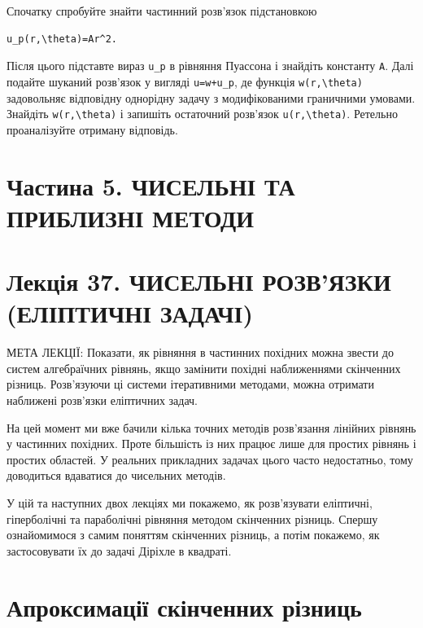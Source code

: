 \documentclass[
  ukrainian,
]{article}
\begin{document}
Спочатку спробуйте знайти частинний розв'язок підстановкою

\begin{verbatim}
u_p(r,\theta)=Ar^2.
\end{verbatim}

Після цього підставте вираз \texttt{u\_p} в рівняння Пуассона і знайдіть
константу \texttt{A}. Далі подайте шуканий розв'язок у вигляді
\texttt{u=w+u\_p}, де функція \texttt{w(r,\textbackslash{}theta)}
задовольняє відповідну однорідну задачу з модифікованими граничними
умовами. Знайдіть \texttt{w(r,\textbackslash{}theta)} і запишіть
остаточний розв'язок \texttt{u(r,\textbackslash{}theta)}. Ретельно
проаналізуйте отриману відповідь.

\section{Частина 5. ЧИСЕЛЬНІ ТА ПРИБЛИЗНІ
МЕТОДИ}\label{ux447ux430ux441ux442ux438ux43dux430-5.-ux447ux438ux441ux435ux43bux44cux43dux456-ux442ux430-ux43fux440ux438ux431ux43bux438ux437ux43dux456-ux43cux435ux442ux43eux434ux438}

\section{Лекція 37. ЧИСЕЛЬНІ РОЗВ'ЯЗКИ (ЕЛІПТИЧНІ
ЗАДАЧІ)}\label{ux43bux435ux43aux446ux456ux44f-37.-ux447ux438ux441ux435ux43bux44cux43dux456-ux440ux43eux437ux432ux44fux437ux43aux438-ux435ux43bux456ux43fux442ux438ux447ux43dux456-ux437ux430ux434ux430ux447ux456}

МЕТА ЛЕКЦІЇ: Показати, як рівняння в частинних похідних можна звести до
систем алгебраїчних рівнянь, якщо замінити похідні наближеннями
скінченних різниць. Розв'язуючи ці системи ітеративними методами, можна
отримати наближені розв'язки еліптичних задач.

На цей момент ми вже бачили кілька точних методів розв'язання лінійних
рівнянь у частинних похідних. Проте більшість із них працює лише для
простих рівнянь і простих областей. У реальних прикладних задачах цього
часто недостатньо, тому доводиться вдаватися до чисельних методів.

У цій та наступних двох лекціях ми покажемо, як розв'язувати еліптичні,
гіперболічні та параболічні рівняння методом скінченних різниць. Спершу
ознайомимося з самим поняттям скінченних різниць, а потім покажемо, як
застосовувати їх до задачі Діріхле в квадраті.

\section{Апроксимації скінченних
різниць}\label{ux430ux43fux440ux43eux43aux441ux438ux43cux430ux446ux456ux457-ux441ux43aux456ux43dux447ux435ux43dux43dux438ux445-ux440ux456ux437ux43dux438ux446ux44c}
\end{document}
